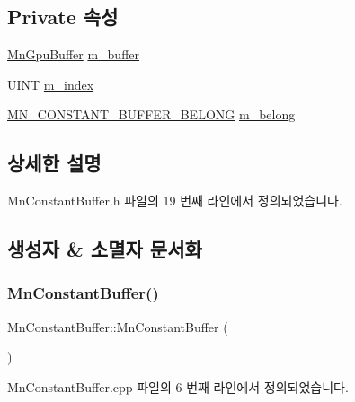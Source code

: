 \subsection*{Private 속성}
\begin{DoxyCompactItemize}
\item 
\hyperlink{class_m_n_l_1_1_mn_gpu_buffer}{Mn\+Gpu\+Buffer} \hyperlink{class_m_n_l_1_1_mn_constant_buffer_a1a9d69098ff55f524716d8415fe76e20}{m\+\_\+buffer}
\item 
U\+I\+NT \hyperlink{class_m_n_l_1_1_mn_constant_buffer_a2ae6082ec83ef177993de6235b0030a1}{m\+\_\+index}
\item 
\hyperlink{namespace_m_n_l_a3f526411258a17023ecac1a36e666d42}{M\+N\+\_\+\+C\+O\+N\+S\+T\+A\+N\+T\+\_\+\+B\+U\+F\+F\+E\+R\+\_\+\+B\+E\+L\+O\+NG} \hyperlink{class_m_n_l_1_1_mn_constant_buffer_aaab10bc1257803aba45c924acab04c35}{m\+\_\+belong}
\end{DoxyCompactItemize}


\subsection{상세한 설명}


Mn\+Constant\+Buffer.\+h 파일의 19 번째 라인에서 정의되었습니다.



\subsection{생성자 \& 소멸자 문서화}
\mbox{\label{class_m_n_l_1_1_mn_constant_buffer_a1ee7c81dedfacf937bef2831f5f296d2}} 
\subsubsection{\texorpdfstring{Mn\+Constant\+Buffer()}{MnConstantBuffer()}}
{\footnotesize\ttfamily Mn\+Constant\+Buffer\+::\+Mn\+Constant\+Buffer (\begin{DoxyParamCaption}{ }\end{DoxyParamCaption})}



Mn\+Constant\+Buffer.\+cpp 파일의 6 번째 라인에서 정의되었습니다.

